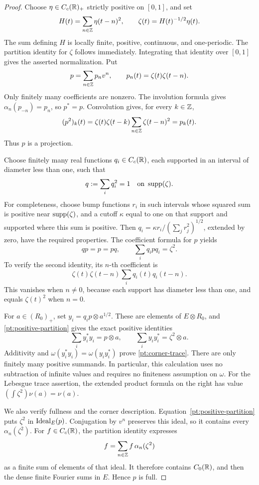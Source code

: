 \begin{proof}
Choose \(\eta\in C_c(\mathbb R)_+\) strictly positive on
\([0,1]\), and set
\[
 H(t)=\sum_{n\in\mathbb Z}\eta(t-n)^2,\qquad
 \zeta(t)=H(t)^{-1/2}\eta(t).
\]
The sum defining \(H\) is locally finite, positive,
continuous, and one-periodic.  The partition identity
for \(\zeta\) follows immediately.  Integrating that
identity over \([0,1]\) gives the asserted normalization.
Put
\begin{equation}\label{pt:projection-formula}
 p=\sum_{n\in\mathbb Z}p_n v^n,
 \qquad p_n(t)=\zeta(t)\zeta(t-n).
\end{equation}
Only finitely many coefficients are nonzero.  The
involution formula gives
\(\alpha_n(p_{-n})=p_n\), so \(p^*=p\).
Convolution gives, for every \(k\in\mathbb Z\),
\[
 (p^2)_k(t)
 =\zeta(t)\zeta(t-k)\sum_{n\in\mathbb Z}\zeta(t-n)^2
 =p_k(t).
\]
Thus \(p\) is a projection.

Choose finitely many real functions \(q_i\in C_c(\mathbb R)\),
each supported in an interval of diameter less than one,
such that
\[
 q:=\sum_iq_i^2=1\quad\hbox{on }\operatorname{supp}(\zeta).
\]
For completeness, choose bump functions \(r_i\) in such
intervals whose squared sum is positive near
\(\operatorname{supp}(\zeta)\), and a cutoff \(\kappa\) equal to one
on that support and supported where this sum is positive.
Then \(q_i=\kappa r_i/(\sum_jr_j^2)^{1/2}\), extended
by zero, have the required properties.
The coefficient formula for \(p\) yields
\begin{equation}\label{pt:positive-partition}
 qp=p=pq,\qquad \sum_iq_i p q_i=\zeta^2.
\end{equation}
To verify the second identity, its \(n\)-th coefficient
is
\[
 \zeta(t)\zeta(t-n)\sum_iq_i(t)q_i(t-n).
\]
This vanishes when \(n\ne0\), because each support has
diameter less than one, and equals \(\zeta(t)^2\) when
\(n=0\).

For \(a\in(R_0)_+\), set \(y_i=q_i p\otimes a^{1/2}\).
These are elements of \(E\otimes R_0\), and
\eqref{pt:positive-partition} gives the exact positive
identities
\[
 \sum_i y_i^*y_i=p\otimes a,\qquad
 \sum_i y_i y_i^*=\zeta^2\otimes a.
\]
Additivity and \(\omega(y_i^*y_i)=\omega(y_i y_i^*)\)
prove \eqref{pt:corner-trace}.  There are only finitely
many positive summands.  In particular, this calculation
uses no subtraction of infinite values and requires no
finiteness assumption on \(\omega\).
For the Lebesgue trace assertion, the extended product formula
on the right has value
\((\int\zeta^2)\nu(a)=\nu(a)\).

We also verify fullness and the corner description.
Equation~\eqref{pt:positive-partition} puts
\(\zeta^2\) in \(\operatorname{Ideal}_E(p)\).
Conjugation by \(v^n\) preserves this ideal, so it contains
every \(\alpha_n(\zeta^2)\).
For \(f\in C_c(\mathbb R)\), the partition identity expresses
\[
 f=\sum_{n\in\mathbb Z}f\,\alpha_n(\zeta^2)
\]
as a finite sum of elements of that ideal.
It therefore contains \(C_0(\mathbb R)\), and then the dense
finite Fourier sums in \(E\).  Hence \(p\) is full.


\end{proof}
